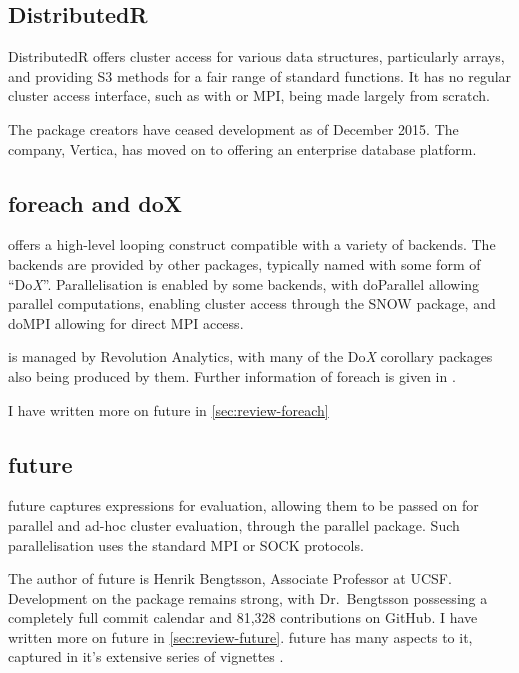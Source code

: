 \hypertarget{sec:distributedr}{%
    \subsection{DistributedR}\label{sec:distributedr}}

DistributedR offers cluster access for various \R data structures,
particularly arrays, and providing S3 methods for a fair range of
standard functions. It has no regular cluster access interface, such as
with  or MPI, being made largely from scratch.

The package creators have ceased development as of December 2015. The
company, Vertica, has moved on to offering an enterprise database
platform\cite{vertica:_distr}.

\hypertarget{sec:foreach-doc}{%
    \subsection{foreach and doX}\label{sec:foreach-doc}}

 offers a high-level looping construct compatible with a variety
of backends\cite{microsoft20}. The backends are provided by other
packages, typically named with some form of ``Do\emph{X}''.
Parallelisation is enabled by some backends, with doParallel allowing
parallel computations\cite{corporation19},  enabling cluster
access through the SNOW package\cite{dosnow19}, and doMPI allowing for
direct MPI access\cite{weston17}.

 is managed by Revolution Analytics, with many of the Do\emph{X}
corollary packages also being produced by them. Further information of
foreach is given in \cite{weston19:_using}.

I have written more on future in \cref{sec:review-foreach}

\hypertarget{sec:future-furrr}{%
    \subsection{future}\label{sec:future-furrr}}

future captures \R expressions for evaluation, allowing them to be passed
on for parallel and ad-hoc cluster evaluation, through the parallel
package\cite{bengtsson20}. Such parallelisation uses the standard MPI or
SOCK protocols.

The author of future is Henrik Bengtsson, Associate Professor at UCSF.
Development on the package remains strong, with Dr.~Bengtsson possessing
a completely full commit calendar and 81,328 contributions on GitHub. I
have written more on future in \cref{sec:review-future}. future has many aspects to it, captured in it's
extensive series of vignettes\cite{bengtsson20:_futur_r}\cite{bengtsson20:_futur_r2}
\cite{bengtsson20:_futur_r3}\cite{bengtsson20:_futur_r4}\cite{bengtsson20:_futur_r5}\cite{bengtsson20:_futur_r6}.

